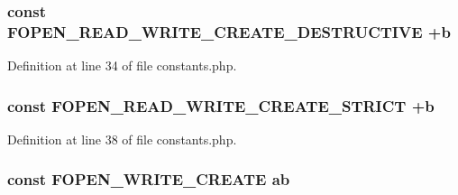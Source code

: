 \subsubsection[{\texorpdfstring{F\+O\+P\+E\+N\+\_\+\+R\+E\+A\+D\+\_\+\+W\+R\+I\+T\+E\+\_\+\+C\+R\+E\+A\+T\+E\+\_\+\+D\+E\+S\+T\+R\+U\+C\+T\+I\+VE}{FOPEN_READ_WRITE_CREATE_DESTRUCTIVE}}]{\setlength{\rightskip}{0pt plus 5cm}const F\+O\+P\+E\+N\+\_\+\+R\+E\+A\+D\+\_\+\+W\+R\+I\+T\+E\+\_\+\+C\+R\+E\+A\+T\+E\+\_\+\+D\+E\+S\+T\+R\+U\+C\+T\+I\+VE +{\bf b}\textquotesingle{}}\hypertarget{constants_8php_a1b8581dfce24061e847cc257aed23d62}{}\label{constants_8php_a1b8581dfce24061e847cc257aed23d62}


Definition at line 34 of file constants.\+php.

\subsubsection[{\texorpdfstring{F\+O\+P\+E\+N\+\_\+\+R\+E\+A\+D\+\_\+\+W\+R\+I\+T\+E\+\_\+\+C\+R\+E\+A\+T\+E\+\_\+\+S\+T\+R\+I\+CT}{FOPEN_READ_WRITE_CREATE_STRICT}}]{\setlength{\rightskip}{0pt plus 5cm}const F\+O\+P\+E\+N\+\_\+\+R\+E\+A\+D\+\_\+\+W\+R\+I\+T\+E\+\_\+\+C\+R\+E\+A\+T\+E\+\_\+\+S\+T\+R\+I\+CT +{\bf b}\textquotesingle{}}\hypertarget{constants_8php_a2eeb98a015d74560e9b60ec60d7531d4}{}\label{constants_8php_a2eeb98a015d74560e9b60ec60d7531d4}


Definition at line 38 of file constants.\+php.

\subsubsection[{\texorpdfstring{F\+O\+P\+E\+N\+\_\+\+W\+R\+I\+T\+E\+\_\+\+C\+R\+E\+A\+TE}{FOPEN_WRITE_CREATE}}]{\setlength{\rightskip}{0pt plus 5cm}const F\+O\+P\+E\+N\+\_\+\+W\+R\+I\+T\+E\+\_\+\+C\+R\+E\+A\+TE \textquotesingle{}ab\textquotesingle{}}\hypertarget{constants_8php_a7c5689a170bbaab4dd9c6f3a76bd7a0d}{}\label{constants_8php_a7c5689a170bbaab4dd9c6f3a76bd7a0d}


